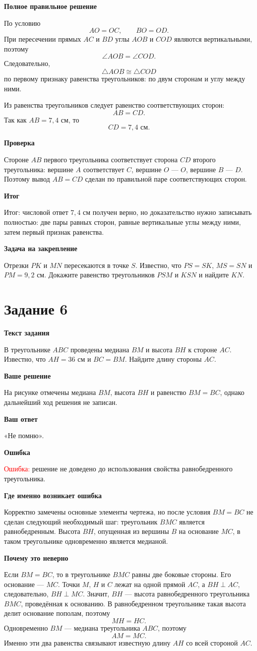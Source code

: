 \documentclass[12pt,a4paper]{article}
\newcommand{\tasktitle}[1]{%
  \phantomsection\label{task:#1}%
  \section*{Задание #1}%
}
\newcommand{\errorlabel}[1]{\textcolor{red}{Ошибка:} #1}
\newcommand{\finalnote}[1]{\textcolor{teal!60!black}{Итог:} #1}
\newcommand{\subhead}[1]{\vspace{0.3em}\textbf{#1}\par}
\begin{document}
\subhead{Полное правильное решение}
По условию
\[
AO=OC,\qquad BO=OD.
\]
При пересечении прямых $AC$ и $BD$ углы $AOB$ и $COD$ являются
вертикальными, поэтому
\[
\angle AOB=\angle COD.
\]
Следовательно,
\[
\triangle AOB\cong\triangle COD
\]
по первому признаку равенства треугольников:
по двум сторонам и углу между ними.

Из равенства треугольников следует равенство соответствующих сторон:
\[
AB=CD.
\]
Так как $AB=7{,}4$ см, то
\[
CD=7{,}4\text{ см}.
\]

\subhead{Проверка}
Стороне $AB$ первого треугольника соответствует сторона $CD$
второго треугольника:
вершине $A$ соответствует $C$, вершине $O$ --- $O$,
вершине $B$ --- $D$.
Поэтому вывод $AB=CD$ сделан по правильной паре соответствующих сторон.

\subhead{Итог}
\finalnote{числовой ответ $7{,}4$ см получен верно,
но доказательство нужно записывать полностью:
две пары равных сторон, равные вертикальные углы между ними,
затем первый признак равенства.}

\subhead{Задача на закрепление}
Отрезки $PK$ и $MN$ пересекаются в точке $S$.
Известно, что $PS=SK$, $MS=SN$ и $PM=9{,}2$ см.
Докажите равенство треугольников $PSM$ и $KSN$ и найдите $KN$.

\newpage
\tasktitle{6}

\subhead{Текст задания}
В треугольнике $ABC$ проведены медиана $BM$ и высота $BH$
к стороне $AC$.
Известно, что $AH=36$ см и $BC=BM$.
Найдите длину стороны $AC$.

\subhead{Ваше решение}
На рисунке отмечены медиана $BM$, высота $BH$ и равенство $BM=BC$,
однако дальнейший ход решения не записан.

\subhead{Ваш ответ}
«Не помню».

\subhead{Ошибка}
\errorlabel{решение не доведено до использования свойства
равнобедренного треугольника.}

\subhead{Где именно возникает ошибка}
Корректно замечены основные элементы чертежа, но после условия $BM=BC$
не сделан следующий необходимый шаг:
треугольник $BMC$ является равнобедренным.
Высота $BH$, опущенная из вершины $B$ на основание $MC$,
в таком треугольнике одновременно является медианой.

\subhead{Почему это неверно}
Если $BM=BC$, то в треугольнике $BMC$ равны две боковые стороны.
Его основание --- $MC$.
Точки $M$, $H$ и $C$ лежат на одной прямой $AC$, а $BH\perp AC$,
следовательно, $BH\perp MC$.
Значит, $BH$ --- высота равнобедренного треугольника $BMC$,
проведённая к основанию.
В равнобедренном треугольнике такая высота делит основание пополам,
поэтому
\[
MH=HC.
\]
Одновременно $BM$ --- медиана треугольника $ABC$, поэтому
\[
AM=MC.
\]
Именно эти два равенства связывают известную длину $AH$
со всей стороной $AC$.
\end{document}

